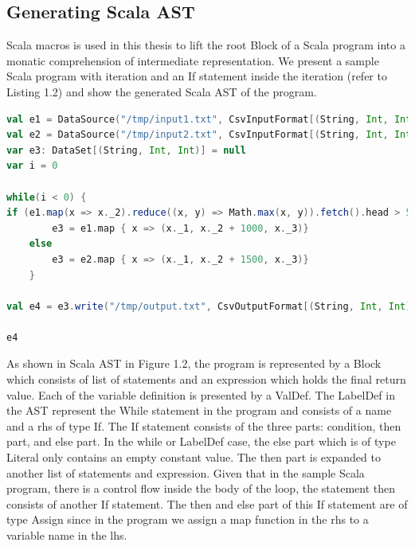 \subsection{Generating Scala AST}
Scala macros is used in this thesis to lift the root Block of a Scala program into a monatic comprehension of intermediate representation. We present a sample Scala program with iteration and an If statement inside the iteration (refer to Listing 1.2) and show the generated Scala AST of the program. 
\\
\begin{lstlisting}[language=scala, caption=Workflow with Conditional, label = workflow2]
val e1 = DataSource("/tmp/input1.txt", CsvInputFormat[(String, Int, Int)]()).filter(x => x._1 == "Joshua")
val e2 = DataSource("/tmp/input2.txt", CsvInputFormat[(String, Int, Int)]()).filter(x => x._1 == "Marten")
var e3: DataSet[(String, Int, Int)] = null
var i = 0

while(i < 0) {
if (e1.map(x => x._2).reduce((x, y) => Math.max(x, y)).fetch().head > 50)
        e3 = e1.map { x => (x._1, x._2 + 1000, x._3)}
    else
    	e3 = e2.map { x => (x._1, x._2 + 1500, x._3)}
    }

val e4 = e3.write("/tmp/output.txt", CsvOutputFormat[(String, Int, Int)]())

e4
\end{lstlisting}

As shown in Scala AST in Figure 1.2, the program is represented by a Block which consists of list of statements and an expression which holds the final return value. Each of the variable definition is presented by a ValDef. The LabelDef in the AST represent the While statement in the program and consists of a name and a rhs of type If. The If statement consists of the three parts: condition, then part, and else part. In the while or LabelDef case, the else part which is of type Literal only contains an empty constant value. The then part is expanded to another list of statements and expression. Given that in the sample Scala program, there is a control flow inside the body of the loop, the statement then consists of another If statement. The then and else part of this If statement are of type Assign since in the program we assign a map function in the rhs to a variable name in the lhs. 

